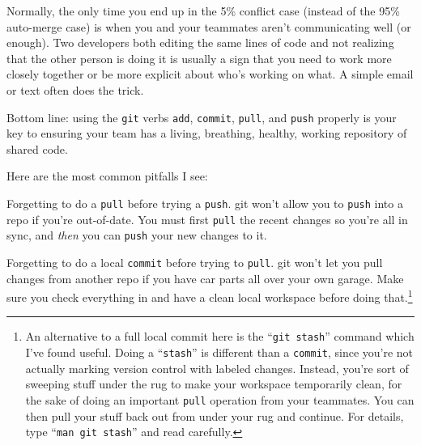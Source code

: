 \begin{itemize}
Normally, the only time you end up in the 5\% conflict case (instead of the
95\% auto-merge case) is when you and your teammates aren't communicating well
(or enough). Two developers both editing the same lines of code and not
realizing that the other person is doing it is usually a sign that you need to
work more closely together or be more explicit about who's working on what. A
simple email or text often does the trick.

\end{itemize}

Bottom line: using the \texttt{git} verbs \texttt{add}, \texttt{commit},
\texttt{pull}, and \texttt{push} properly is your key to ensuring your team
has a living, breathing, healthy, working repository of shared code.

Here are the most common pitfalls I see:

\begin{compactitem} \item Forgetting to do a \texttt{pull} before trying a
\texttt{push}. git won't allow you to \texttt{push} into a repo if you're
out-of-date. You must first \texttt{pull} the recent changes so you're all in
sync, and \textit{then} you can \texttt{push} your new changes to it. \item
Forgetting to do a local \texttt{commit} before trying to \texttt{pull}. git
won't let you pull changes from another repo if you have car parts all over
your own garage. Make sure you check everything in and have a clean local
workspace before doing that.\footnote{An alternative to a full local commit
here is the ``\texttt{git stash}'' command which I've found useful. Doing a
``\texttt{stash}'' is different than a \texttt{commit}, since you're not
actually marking version control with labeled changes. Instead, you're sort of
sweeping stuff under the rug to make your workspace temporarily clean, for the
sake of doing an important \texttt{pull} operation from your teammates. You
can then pull your stuff back out from under your rug and continue. For
details, type ``\texttt{man git stash}'' and read carefully.}

\end{compactitem}



